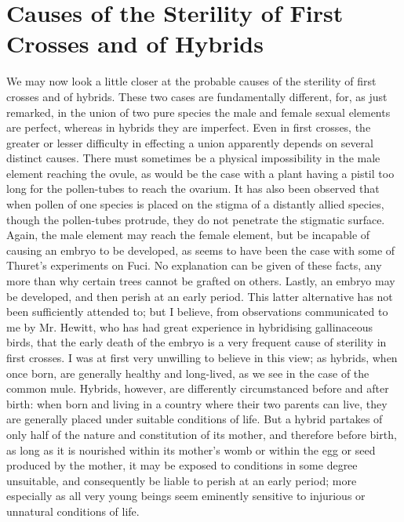 \section{Causes of the Sterility of First Crosses and of Hybrids}
We may now look a little closer at the probable causes of the sterility of first crosses and of hybrids. These two cases are fundamentally different, for, as just remarked, in the union of two pure species the male and female sexual elements are perfect, whereas in hybrids they are imperfect. Even in first crosses, the greater or lesser difficulty in effecting a union apparently depends on several distinct causes. There must sometimes be a physical impossibility in the male element reaching the ovule, as would be the case with a plant having a pistil too long for the pollen-tubes to reach the ovarium. It has also been observed that when pollen of one species is placed on the stigma of a distantly allied species, though the pollen-tubes protrude, they do not penetrate the stigmatic surface. Again, the male element may reach the female element, but be incapable of causing an embryo to be developed, as seems to have been the case with some of Thuret's experiments on Fuci. No explanation can be given of these facts, any more than why certain trees cannot be grafted on others. Lastly, an embryo may be developed, and then perish at an early period. This latter alternative has not been sufficiently attended to; but I believe, from observations communicated to me by Mr. Hewitt, who has had great experience in hybridising gallinaceous birds, that the early death of the embryo is a very frequent cause of sterility in first crosses. I was at first very unwilling to believe in this view; as hybrids, when once born, are generally healthy and long-lived, as we see in the case of the common mule. Hybrids, however, are differently circumstanced before and after birth: when born and living in a country where their two parents can live, they are generally placed under suitable conditions of life. But a hybrid partakes of only half of the nature and constitution of its mother, and therefore before birth, as long as it is nourished within its mother's womb or within the egg or seed produced by the mother, it may be exposed to conditions in some degree unsuitable, and consequently be liable to perish at an early period; more especially as all very young beings seem eminently sensitive to injurious or unnatural conditions of life.
